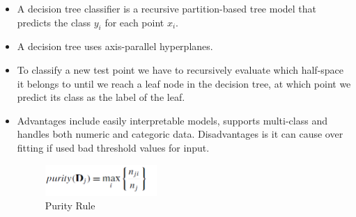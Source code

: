 \begin{itemize}
    \item A decision tree classifier is a recursive partition-based tree model that predicts the class $y_i$ for each point $x_i$.
    \item A decision tree uses axis-parallel hyperplanes.
    \item To classify a new test point we have to recursively evaluate which half-space it belongs to until we reach a leaf node in the decision tree, at which point we predict its class as the label of the leaf.
    \item Advantages include easily interpretable models, supports multi-class and handles both numeric and categoric data. Disadvantages is it can cause over fitting if used bad threshold values for input.
    \begin{figure}[H]
        \centerline{\includegraphics[width=0.4\textwidth]{Figures/dt1}}
        \caption{\label{fig:figure}Purity Rule}
    \end{figure}

\end{itemize}
